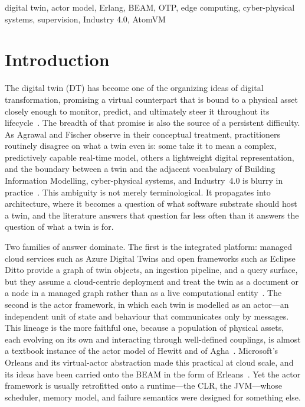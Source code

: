\documentclass[conference]{IEEEtran}
\newcommand{\beam}{BEAM\xspace}
\newcommand{\dt}{DT\xspace}
\begin{document}
\begin{IEEEkeywords}
digital twin, actor model, Erlang, BEAM, OTP, edge computing, cyber-physical
systems, supervision, Industry 4.0, AtomVM
\end{IEEEkeywords}

\section{Introduction}
The digital twin (\dt) has become one of the organizing ideas of digital
transformation, promising a virtual counterpart that is bound to a physical
asset closely enough to monitor, predict, and ultimately steer it throughout
its lifecycle~\cite{handbook,tao2019,fuller2020}. The breadth of that promise
is also the source of a persistent difficulty. As Agrawal and Fischer observe
in their conceptual treatment, practitioners routinely disagree on what a twin
even is: some take it to mean a complex, predictively capable real-time model,
others a lightweight digital representation, and the boundary between a twin and
the adjacent vocabulary of Building Information Modelling, cyber-physical
systems, and Industry~4.0 is blurry in practice~\cite{agrawal2024,fuller2020}.
This ambiguity is not merely terminological. It propagates into architecture,
where it becomes a question of what software substrate should host a twin, and
the literature answers that question far less often than it answers the
question of what a twin is for.

Two families of answer dominate. The first is the integrated platform: managed
cloud services such as Azure Digital Twins and open frameworks such as Eclipse
Ditto provide a graph of twin objects, an ingestion pipeline, and a query
surface, but they assume a cloud-centric deployment and treat the twin as a
document or a node in a managed graph rather than as a live computational
entity~\cite{ditto,azuredt}. The second is the actor framework, in which each
twin is modelled as an actor---an independent unit of state and behaviour that
communicates only by messages. This lineage is the more faithful one, because a
population of physical assets, each evolving on its own and interacting through
well-defined couplings, is almost a textbook instance of the actor model of
Hewitt and of Agha~\cite{hewitt1973,agha1986}. Microsoft's Orleans and its
virtual-actor abstraction made this practical at cloud scale, and its ideas
have been carried onto the \beam in the form of Erleans~\cite{orleans,erleans}.
Yet the actor framework is usually retrofitted onto a runtime---the CLR, the
JVM---whose scheduler, memory model, and failure semantics were designed for
something else.
\end{document}
